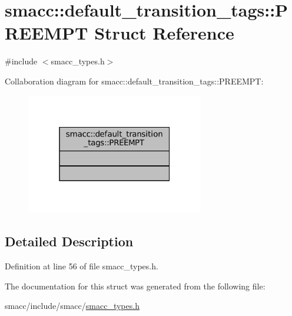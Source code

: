 \hypertarget{structsmacc_1_1default__transition__tags_1_1PREEMPT}{}\section{smacc\+:\+:default\+\_\+transition\+\_\+tags\+:\+:P\+R\+E\+E\+M\+PT Struct Reference}
\label{structsmacc_1_1default__transition__tags_1_1PREEMPT}


{\ttfamily \#include $<$smacc\+\_\+types.\+h$>$}



Collaboration diagram for smacc\+:\+:default\+\_\+transition\+\_\+tags\+:\+:P\+R\+E\+E\+M\+PT\+:
\nopagebreak
\begin{figure}[H]
\begin{center}
\leavevmode
\includegraphics[width=220pt]{structsmacc_1_1default__transition__tags_1_1PREEMPT__coll__graph}
\end{center}
\end{figure}


\subsection{Detailed Description}


Definition at line 56 of file smacc\+\_\+types.\+h.



The documentation for this struct was generated from the following file\+:\begin{DoxyCompactItemize}
\item 
smacc/include/smacc/\hyperlink{smacc__types_8h}{smacc\+\_\+types.\+h}\end{DoxyCompactItemize}
